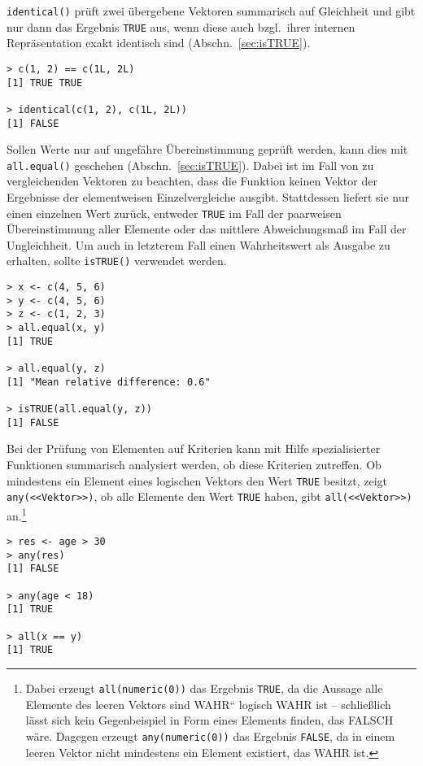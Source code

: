 \lstinline!identical()! prüft zwei übergebene Vektoren summarisch auf Gleichheit und gibt nur dann das Ergebnis \lstinline!TRUE! aus, wenn diese auch bzgl.\ ihrer internen Repräsentation exakt identisch sind (Abschn.\ \ref{sec:isTRUE}).
\begin{lstlisting}
> c(1, 2) == c(1L, 2L)
[1] TRUE TRUE

> identical(c(1, 2), c(1L, 2L))
[1] FALSE
\end{lstlisting}

Sollen Werte nur auf ungefähre Übereinstimmung geprüft werden, kann dies mit \lstinline!all.equal()! geschehen (Abschn.\ \ref{sec:isTRUE}). Dabei ist im Fall von zu vergleichenden Vektoren zu beachten, dass die Funktion keinen Vektor der Ergebnisse der elementweisen Einzelvergleiche ausgibt. Stattdessen liefert sie nur einen einzelnen Wert zurück, entweder \lstinline!TRUE! im Fall der paarweisen Übereinstimmung aller Elemente oder das mittlere Abweichungsmaß im Fall der Ungleichheit. Um auch in letzterem Fall einen Wahrheitswert als Ausgabe zu erhalten, sollte \lstinline!isTRUE()! verwendet werden.
\begin{lstlisting}
> x <- c(4, 5, 6)
> y <- c(4, 5, 6)
> z <- c(1, 2, 3)
> all.equal(x, y)
[1] TRUE

> all.equal(y, z)
[1] "Mean relative difference: 0.6"

> isTRUE(all.equal(y, z))
[1] FALSE
\end{lstlisting}

Bei der Prüfung von Elementen auf Kriterien kann mit Hilfe spezialisierter Funktionen summarisch analysiert werden, ob diese Kriterien zutreffen. Ob mindestens ein Element eines logischen Vektors den Wert \lstinline!TRUE! besitzt, zeigt \lstinline!any(<<Vektor>>)!, ob alle Elemente den Wert \lstinline!TRUE! haben, gibt \lstinline!all(<<Vektor>>)! an.\footnote{Dabei erzeugt \lstinline!all(numeric(0))! das Ergebnis \lstinline!TRUE!, da die Aussage {\quotedblbase}alle Elemente des leeren Vektors sind WAHR{\textquotedblleft} logisch WAHR ist -- schließlich lässt sich kein Gegenbeispiel in Form eines Elements finden, das FALSCH wäre. Dagegen erzeugt \lstinline!any(numeric(0))! das Ergebnis \lstinline!FALSE!, da in einem leeren Vektor nicht mindestens ein Element existiert, das WAHR ist.}
\begin{lstlisting}
> res <- age > 30
> any(res)
[1] FALSE

> any(age < 18)
[1] TRUE

> all(x == y)
[1] TRUE
\end{lstlisting}

